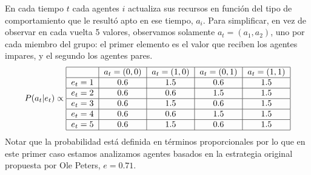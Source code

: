 \documentclass[a4paper,10pt]{article}
\begin{document}
%
En cada tiempo $t$ cada agentes $i$ actualiza sus recursos en función del tipo de comportamiento que le resultó apto en ese tiempo, $a_i$.
Para simplificar, en vez de observar en cada vuelta 5 valores, observamos solamente $a_t=(a_1, a_2)$, uno por cada miembro del grupo: el primer elemento es el valor que reciben los agentes impares, y el segundo los agentes pares. 
%
\begin{align}
\centering
P(a_{t}|e_{t}) \propto \begin{tabular}{|c|c|c|c|c|c|c|}
        \hline
        & $a_t=(0,0)$ & $a_t=(1,0)$ & $a_t=(0,1)$ &  $a_t=(1,1)$  \\ \hline
       $e_{t}=1$ & $0.6$ & $1.5$ & $0.6$ & $1.5$ \\ \hline
       $e_{t}=2$ & $0.6$ & $0.6$ & $1.5$ & $1.5$  \\ \hline
       $e_{t}=3$ & $0.6$ & $1.5$ & $0.6$ & $1.5$  \\ \hline
       $e_{t}=4$ & $0.6$ & $0.6$ & $1.5$ & $1.5$ \\ \hline
       $e_{t}=5$ & $0.6$ & $1.5$ & $0.6$ & $1.5$ \\ \hline
\end{tabular}
\end{align}
Notar que la probabilidad está definida en términos proporcionales por lo que en este primer caso estamos analizamos agentes basados en la estrategia original propuesta por Ole Peters, $e=0.71$.

\end{document}
